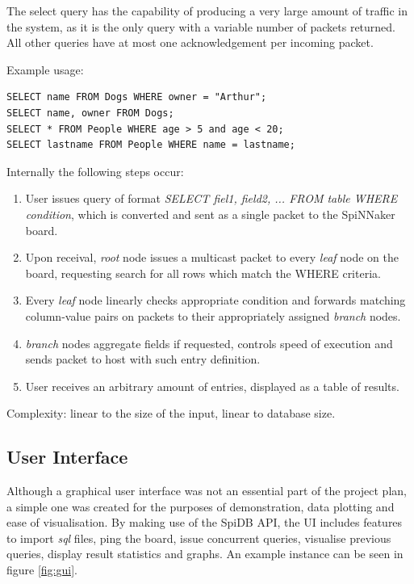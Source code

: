 The select query has the capability of producing a very large amount of traffic in the system, as it is the only query with a variable number of packets returned. All other queries have at most one acknowledgement per incoming packet. 

Example usage:
\begin{lstlisting}
SELECT name FROM Dogs WHERE owner = "Arthur";
SELECT name, owner FROM Dogs;
SELECT * FROM People WHERE age > 5 and age < 20;
SELECT lastname FROM People WHERE name = lastname;
\end{lstlisting}
   
Internally the following steps occur:
\begin{enumerate}
\item User issues query of format \textit{SELECT fiel1, field2, ... FROM table WHERE condition}, which is converted and sent as a single packet to the SpiNNaker board.
\item Upon receival, \textit{root} node issues a multicast packet to every \textit{leaf} node on the board, requesting search for all rows which match the WHERE criteria.
\item Every \textit{leaf} node linearly checks appropriate condition and forwards matching column-value pairs on packets to their appropriately assigned \textit{branch} nodes.
\item \textit{branch} nodes aggregate fields if requested, controls speed of execution and sends packet to host with such entry definition.
\item User receives an arbitrary amount of entries, displayed as a table of results.
\end{enumerate}

Complexity: linear to the size of the input, linear to database size.
 
\subsection{User Interface} 
Although a graphical user interface was not an essential part of the project plan, a simple one was created for the purposes of demonstration, data plotting and ease of visualisation. By making use of the SpiDB API, the UI includes features to import \textit{sql} files, ping the board, issue concurrent queries, visualise previous queries, display result statistics and graphs. An example instance can be seen in figure \ref{fig:gui}.

